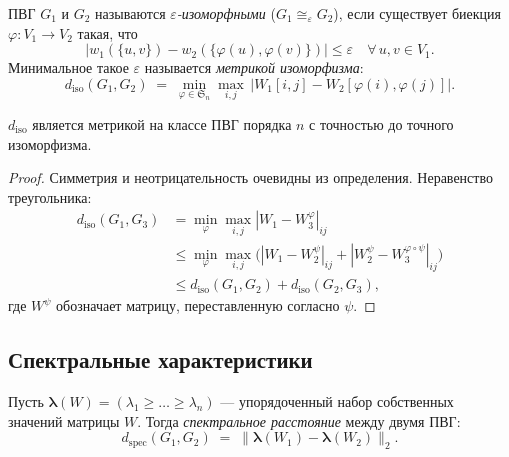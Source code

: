 \begin{definition}
\label{def:eps_iso}
ПВГ $G_1$ и $G_2$ называются \emph{$\varepsilon$-изоморфными} ($G_1 \cong_\varepsilon G_2$),
если существует биекция $\varphi\colon V_1 \to V_2$ такая, что
\[
    \bigl|w_1(\{u,v\}) - w_2(\{\varphi(u),\varphi(v)\})\bigr| \le \varepsilon
    \quad \forall\, u, v \in V_1.
\]
Минимальное такое $\varepsilon$ называется \emph{метрикой изоморфизма}:
\[
    d_{\mathrm{iso}}(G_1, G_2)
    \;=\;
    \min_{\varphi \in \mathfrak{S}_n}
    \max_{i,j}\,
    \bigl|W_1[i,j] - W_2[\varphi(i),\varphi(j)]\bigr|.
\]
\end{definition}

\begin{proposition}
$d_{\mathrm{iso}}$ является метрикой на классе ПВГ порядка $n$ с точностью до точного
изоморфизма.
\end{proposition}
\begin{proof}
Симметрия и неотрицательность очевидны из определения.
Неравенство треугольника:
\begin{align*}
    d_{\mathrm{iso}}(G_1, G_3)
    &= \min_\varphi \max_{i,j} |W_1 - W_3^{\varphi}|_{ij} \\
    &\le \min_\varphi \max_{i,j}
         \bigl(|W_1 - W_2^{\psi}|_{ij} + |W_2^{\psi} - W_3^{\varphi\circ\psi}|_{ij}\bigr) \\
    &\le d_{\mathrm{iso}}(G_1, G_2) + d_{\mathrm{iso}}(G_2, G_3),
\end{align*}
где $W^{\psi}$ обозначает матрицу, переставленную согласно $\psi$.
\end{proof}

\subsection{Спектральные характеристики}

\begin{definition}
Пусть $\boldsymbol{\lambda}(W) = (\lambda_1 \ge \ldots \ge \lambda_n)$ —
упорядоченный набор собственных значений матрицы $W$.
Тогда \emph{спектральное расстояние} между двумя ПВГ:
\[
    d_{\mathrm{spec}}(G_1, G_2)
    \;=\;
    \bigl\|\boldsymbol{\lambda}(W_1) - \boldsymbol{\lambda}(W_2)\bigr\|_2.
\]
\end{definition}

